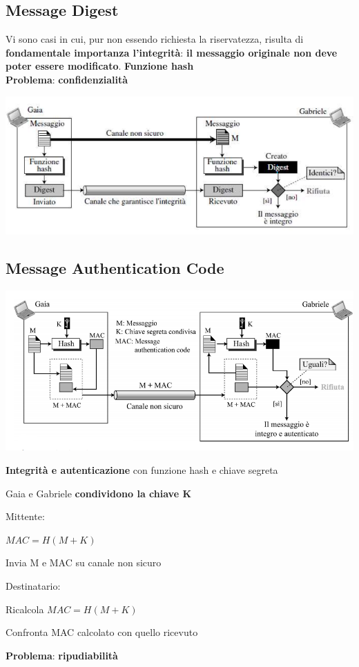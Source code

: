 \documentclass[10pt]{article}
\begin{document}
{\subsection{Message Digest}
Vi sono casi in cui, pur non essendo richiesta la riservatezza, risulta di \textbf{fondamentale importanza l'integrità}: \textbf{il messaggio originale non deve poter essere modificato}. \textbf{Funzione hash}\\
\textbf{Problema}: \textbf{confidenzialità}
\begin{center}
\includegraphics[scale=0.7]{msgdigest.png}
\end{center}
\subsection{Message Authentication Code}
\begin{center}
\includegraphics[scale=0.7]{msgauthcode.png}
\end{center}
\begin{list}{}{}
	\item \textbf{Integrità e autenticazione} con funzione hash e chiave segreta
	\item Gaia e Gabriele \textbf{condividono la chiave K}
	\item Mittente:
		\begin{list}{}{}
		\item $MAC = H(M + K)$
		\item Invia M e MAC su canale non sicuro
		\end{list}
	\item Destinatario:
		\begin{list}{}{}
		\item Ricalcola $MAC = H(M + K)$
		\item Confronta MAC calcolato con quello ricevuto
		\end{list}
	\item \textbf{Problema}: \textbf{ripudiabilità}
\end{list}
\pagebreak
}
\end{document}
